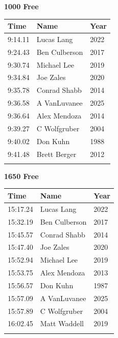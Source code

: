 \vspace{1.2em}
\noindent\begin{minipage}[t]{0.48\textwidth}
\centering
\textbf{\textcolor{teamprimary}{1000 Free}}\par
\vspace{0.5em}
\centering
\small
\renewcommand{\arraystretch}{1.0}
\setlength{\tabcolsep}{4pt}
\begin{tabular}{@{}p{1.8cm}p{3.0cm}p{1.0cm}@{}}
\toprule
\textbf{Time} & \textbf{Name} & \textbf{Year} \\
\midrule
9:14.11 & Lucas Lang & 2022 \\
9:24.43 & Ben Culberson & 2017 \\
9:30.74 & Michael Lee & 2019 \\
9:34.84 & Joe Zales & 2020 \\
9:35.78 & Conrad Shabb & 2014 \\
9:36.58 & A VanLuvanee & 2025 \\
9:36.64 & Alex Mendoza & 2014 \\
9:39.27 & C Wolfgruber & 2004 \\
9:40.02 & Don Kuhn & 1988 \\
9:41.48 & Brett Berger & 2012 \\
\bottomrule
\vspace{0.5em}
\end{tabular}
\end{minipage}
\hfill
\begin{minipage}[t]{0.48\textwidth}
\centering
\textbf{\textcolor{teamprimary}{1650 Free}}\par
\vspace{0.5em}
\centering
\small
\renewcommand{\arraystretch}{1.0}
\setlength{\tabcolsep}{4pt}
\begin{tabular}{@{}p{1.8cm}p{3.0cm}p{1.0cm}@{}}
\toprule
\textbf{Time} & \textbf{Name} & \textbf{Year} \\
\midrule
15:17.24 & Lucas Lang & 2022 \\
15:32.19 & Ben Culberson & 2017 \\
15:45.57 & Conrad Shabb & 2014 \\
15:47.40 & Joe Zales & 2020 \\
15:52.94 & Michael Lee & 2019 \\
15:53.75 & Alex Mendoza & 2013 \\
15:56.57 & Don Kuhn & 1987 \\
15:57.09 & A VanLuvanee & 2025 \\
15:57.89 & C Wolfgruber & 2004 \\
16:02.45 & Matt Waddell & 2019 \\
\bottomrule
\vspace{0.5em}
\end{tabular}
\end{minipage}
